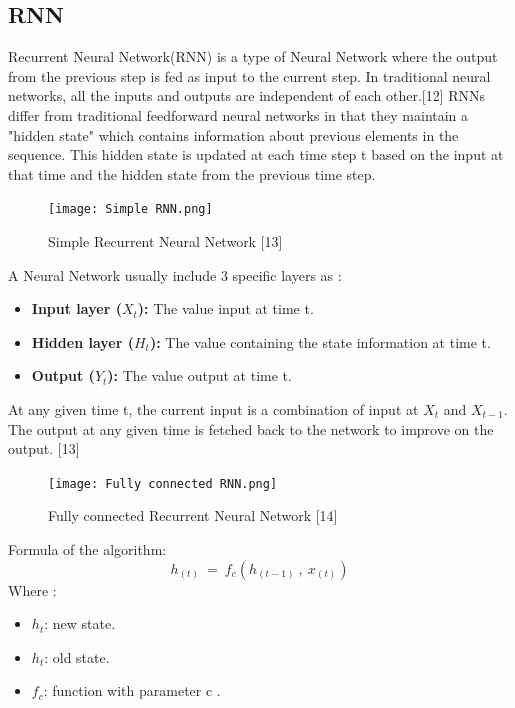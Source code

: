 \documentclass{ieeeojies}
\begin{document}
\subsection{RNN}
\indent Recurrent Neural Network(RNN) is a type of Neural Network where the output from the previous step is fed as input to the current step. In traditional neural networks, all the inputs and outputs are independent of each other.[12] RNNs differ from traditional feedforward neural networks in that they maintain a "hidden state" which contains information about previous elements in the sequence. This hidden state is updated at each time step t based on the input at that time and the hidden state from the previous time step.
\begin{figure}[H]
    \centering
    \begin{minipage}{0.23\textwidth}
    \centering
    \texttt{[image: Simple RNN.png]}
    \caption{Simple Recurrent Neural Network [13]}
    \label{fig:1}
    \end{minipage}
\end{figure}
A Neural Network usually include 3 specific layers as :
\begin{itemize}
    \item \textbf{Input layer (\(X_t\)): } The value input at time t.
\end{itemize}
\begin{itemize}
    \item \textbf{Hidden layer (\(H_t\)):  } The value containing the state information at time t.
\end{itemize}
\begin{itemize}
    \item \textbf{Output (\(Y_t\)):  } The value output at time t.
\end{itemize}

At any given time t, the current input is a combination of input at \(X_t\) and \(X_{t-1}\). The output at any given time is fetched back to the network to improve on the output. [13]


 \begin{figure}[H]
    \centering
    \begin{minipage}{0.50\textwidth}
    \centering
    \texttt{[image: Fully connected RNN.png]}
    \caption{Fully connected Recurrent Neural Network [14]}
    \label{fig:1}
    \end{minipage}
\end{figure}
Formula of the algorithm:
\[h_{(t)}\ =\ f_c(h_{(t-1)}\ ,\ x_{(t)})\]
Where : 
\begin{itemize}
    \item 	\(h_t\): new state.
\end{itemize}
\begin{itemize}
     \item \(h_t\): old state.
 \end{itemize}
 \begin{itemize}
     \item \(f_c\): function with parameter c .
 \end{itemize}
\end{document}
